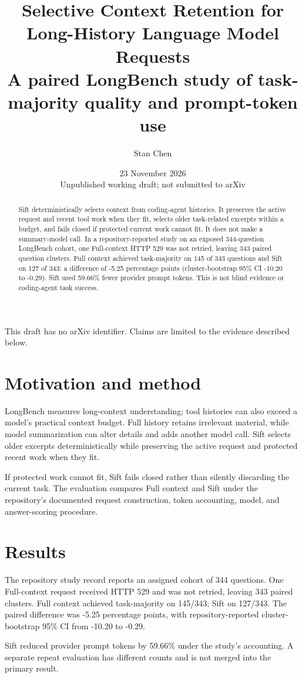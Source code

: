 \documentclass[11pt]{article}
\title{Selective Context Retention for Long-History Language Model Requests\\\large A paired LongBench study of task-majority quality and prompt-token use}
\author{Stan Chen}
\date{23 November 2026\\[4pt]\small Unpublished working draft; not submitted to arXiv}
\begin{document}
\maketitle
\begin{center}\small This draft has no arXiv identifier. Claims are limited to the evidence described below.\end{center}
\begin{abstract}
Sift deterministically selects context from coding-agent histories. It preserves the active request and recent tool work when they fit, selects older task-related excerpts within a budget, and fails closed if protected current work cannot fit. It does not make a summary-model call. In a repository-reported study on an exposed 344-question LongBench cohort, one Full-context HTTP 529 was not retried, leaving 343 paired question clusters. Full context achieved task-majority on 145 of 343 questions and Sift on 127 of 343: a difference of -5.25 percentage points (cluster-bootstrap 95\% CI -10.20 to -0.29). Sift used 59.66\% fewer provider prompt tokens. This is not blind evidence or coding-agent task success.
\end{abstract}
\section{Motivation and method}
LongBench \cite{r1} measures long-context understanding; tool histories can also exceed a model's practical context budget. Full history retains irrelevant material, while model summarization can alter details and adds another model call. Sift selects older excerpts deterministically while preserving the active request and protected recent work when they fit.\par
If protected work cannot fit, Sift fails closed rather than silently discarding the current task. The evaluation compares Full context and Sift under the repository's documented request construction, token accounting, model, and answer-scoring procedure.\par
\section{Results}
The repository study record \cite{r2} reports an assigned cohort of 344 questions. One Full-context request received HTTP 529 and was not retried, leaving 343 paired clusters. Full context achieved task-majority on 145/343; Sift on 127/343. The paired difference was -5.25 percentage points, with repository-reported cluster-bootstrap 95\% CI from -10.20 to -0.29.\par
Sift reduced provider prompt tokens by 59.66\% under the study's accounting. A separate repeat evaluation has different counts and is not merged into the primary result.\par
\end{document}
